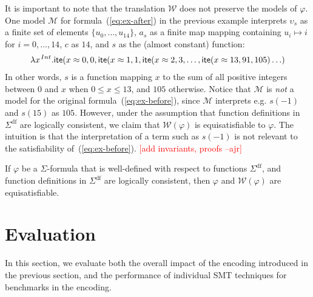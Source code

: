 \documentclass[runningheads,a4paper]{llncs}
\newcommand{\con}[1]{\mathsf{#1}}
\newcommand{\teq}{\approx}
\newcommand{\M}{\mathcal{M}}
\newcommand{\conv}{\mathcal{W}}
\newcommand{\sfundefs}[1]{#1^\mathrm{df}}
\newcommand{\lite}{\con{ite}}
\newcommand{\farg}[1]{a_{#1}}
\newcommand{\fargsort}[1]{\upsilon_{#1}}
\newcommand{\rem}[1]{\textcolor{red}{[#1]}}
\newcommand{\ajr}[1]{\rem{#1 --ajr}}
\newcommand{\vthinspace}{\kern+0.083333em}
\newcommand{\typ}[1]{^{\vthinspace #1}}
\begin{document}
It is important to note that the translation $\conv$ does not preserve the models of $\varphi$.
One model $\M$ for formula~(\ref{eq:ex-after}) in the previous example interprets 
$\fargsort{s}$ as a finite set of elements $\{ u_0, \ldots, u_{14} \}$,
$\farg{s}$ as a finite map mapping containing $u_i \mapsto i$ for $i = 0, \ldots, 14$,
$c$ as $14$, 
and $s$ as the (almost constant) function:
\begin{eqnarray}
\lambda x\typ{Int}. \lite( x \teq 0, 0, \lite( x \teq 1, 1, \lite( x \teq 2, 3, \ldots, \lite( x \teq 13, 91, 105 ) \ldots )
\end{eqnarray}
In other words, $s$ is a function mapping $x$ to the sum of all positive integers between $0$ and $x$ when $0 \leq x \leq 13$,
and $105$ otherwise.
Notice that $\M$ is \emph{not} a model for the original formula~(\ref{eq:ex-before}),
since $\M$ interprets e.g. $s( -1 )$ and $s( 15 )$ as $105$.
However, under the assumption that function definitions in $\sfundefs{\Sigma}$ are logically consistent, 
we claim that $\conv(\varphi)$ is equisatisfiable to $\varphi$.
The intuition is that the interpretation of a term such as $s( -1 )$ is not relevant to the satisfiability of~(\ref{eq:ex-before}).
\ajr{add invariants, proofs}

\begin{theorem}
If $\varphi$ be a $\Sigma$-formula that is well-defined with respect to functions $\sfundefs{\Sigma}$,
and function definitions in $\sfundefs{\Sigma}$ are logically consistent,
then $\varphi$ and $\conv( \varphi )$ are equisatisfiable.
\end{theorem}

\section{Evaluation}

In this section, we evaluate both 
the overall impact of the encoding introduced in the previous section, and
the performance of individual SMT techniques for benchmarks in the encoding.
\end{document}

